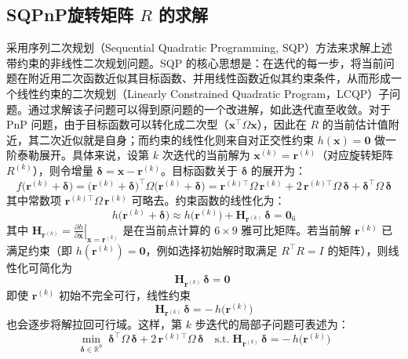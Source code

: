 \subsection{SQPnP旋转矩阵 $R$ 的求解}
采用序列二次规划（Sequential Quadratic Programming, SQP）方法来求解上述带约束的非线性二次规划问题。SQP 的核心思想是：在迭代的每一步，将当前问题在附近用二次函数近似其目标函数、并用线性函数近似其约束条件，从而形成一个线性约束的二次规划（Linearly Constrained Quadratic Program，LCQP）子问题。通过求解该子问题可以得到原问题的一个改进解，如此迭代直至收敛。对于 PnP 问题，由于目标函数可以转化成二次型（$\mathbf{x}^\top \Omega \mathbf{x}$），因此在 $R$ 的当前估计值附近，其二次近似就是自身；而约束的线性化则来自对正交性约束 $h(\mathbf{x})=\mathbf{0}$ 做一阶泰勒展开。具体来说，设第 $k$ 次迭代的当前解为 $\mathbf{x}^{(k)}=\mathbf{r}^{(k)}$（对应旋转矩阵 $R^{(k)}$），则令增量 $\boldsymbol{\delta}= \mathbf{x}-\mathbf{r}^{(k)}$。目标函数关于 $\boldsymbol{\delta}$ 的展开为：
\begin{equation}
	f\bigl(\mathbf{r}^{(k)}+\boldsymbol{\delta}\bigr)
	= \bigl(\mathbf{r}^{(k)}+\boldsymbol{\delta}\bigr)^{\!\top}\!\Omega\bigl(\mathbf{r}^{(k)}+\boldsymbol{\delta}\bigr)
	= \mathbf{r}^{(k)\top}\!\Omega\,\mathbf{r}^{(k)}
	+ 2\,\mathbf{r}^{(k)\top}\!\Omega\,\boldsymbol{\delta}
	+ \boldsymbol{\delta}^{\top}\!\Omega\,\boldsymbol{\delta}
\end{equation}
其中常数项 $\mathbf{r}^{(k)\top}\!\Omega\,\mathbf{r}^{(k)}$ 可略去。约束函数的线性化为：
\begin{equation}
	h\bigl(\mathbf{r}^{(k)}+\boldsymbol{\delta}\bigr)
	\approx
	h\bigl(\mathbf{r}^{(k)}\bigr)
	+ \mathbf{H}_{\mathbf{r}^{(k)}}\,\boldsymbol{\delta}
	= \mathbf{0}_6
\end{equation}
其中 $\mathbf{H}_{\mathbf{r}^{(k)}}=\left.\tfrac{\partial h}{\partial \mathbf{x}}\right|_{\mathbf{x}=\mathbf{r}^{(k)}}$ 是在当前点计算的 $6\times9$ 雅可比矩阵。若当前解 $\mathbf{r}^{(k)}$ 已满足约束（即 $h(\mathbf{r}^{(k)})=\mathbf{0}$，例如选择初始解时取满足 $R^\top R=I$ 的矩阵），则线性化可简化为
\begin{equation}
	\mathbf{H}_{\mathbf{r}^{(k)}}\,\boldsymbol{\delta}= \mathbf{0}\;
\end{equation}
即使 $\mathbf{r}^{(k)}$ 初始不完全可行，线性约束
\begin{equation}
	\mathbf{H}_{\mathbf{r}^{(k)}}\,\boldsymbol{\delta}= -\,h\bigl(\mathbf{r}^{(k)}\bigr)
\end{equation}
也会逐步将解拉回可行域。这样，第 $k$ 步迭代的局部子问题可表述为：
\begin{equation}
	\min_{\boldsymbol{\delta}\in\mathbb{R}^9}\;
	\boldsymbol{\delta}^{\top}\!\Omega\,\boldsymbol{\delta}
	+ 2\,\mathbf{r}^{(k)\top}\!\Omega\,\boldsymbol{\delta}
	\quad
	\text{s.t.}\;
	\mathbf{H}_{\mathbf{r}^{(k)}}\,\boldsymbol{\delta}= -\,h\bigl(\mathbf{r}^{(k)}\bigr)
\end{equation}

